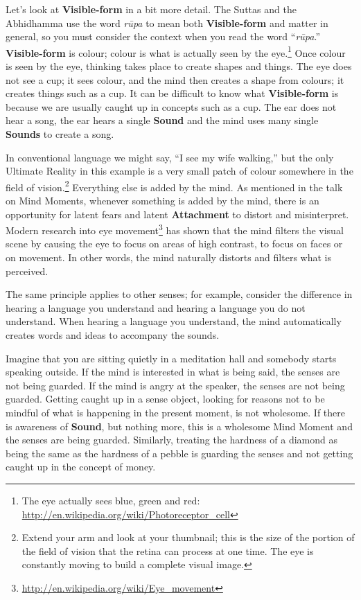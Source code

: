 Let’s look at \textbf{Visible-form} in a bit more detail. The Suttas and the Abhidhamma use the word \textit{rūpa} to mean both \textbf{Visible-form} and matter in general, so you must consider the context when you read the word “\textit{rūpa}.” \textbf{Visible-form} is colour; colour is what is actually seen by the eye.\footnote{The eye actually sees blue, green and red: \url{http://en.wikipedia.org/wiki/Photoreceptor_cell}} Once colour is seen by the eye, thinking takes place to create shapes and things. The eye does not see a cup; it sees colour, and the mind then creates a shape from colours; it creates things such as a cup. It can be difficult to know what \textbf{Visible-form} is because we are usually caught up in concepts such as a cup. The ear does not hear a song, the ear hears a single \textbf{Sound} and the mind uses many single \textbf{Sounds} to create a song.

In conventional language we might say, “I see my wife walking,” but the only Ultimate Reality in this example is a very small patch of colour somewhere in the field of vision.\footnote{Extend your arm and look at your thumbnail; this is the size of the portion of the field of vision that the retina can process at one time. The eye is constantly moving to build a complete visual image.} Everything else is added by the mind. As mentioned in the talk on Mind Moments, whenever something is added by the mind, there is an opportunity for latent fears and latent \textbf{Attachment} to distort and misinterpret. Modern research into eye movement\footnote{\url{http://en.wikipedia.org/wiki/Eye_movement}} has shown that the mind filters the visual scene by causing the eye to focus on areas of high contrast, to focus on faces or on movement. In other words, the mind naturally distorts and filters what is perceived.

The same principle applies to other senses; for example, consider the difference in hearing a language you understand and hearing a language you do not understand. When hearing a language you understand, the mind automatically creates words and ideas to accompany the sounds.

Imagine that you are sitting quietly in a meditation hall and somebody starts speaking outside. If the mind is interested in what is being said, the senses are not being guarded. If the mind is angry at the speaker, the senses are not being guarded. Getting caught up in a sense object, looking for reasons not to be mindful of what is happening in the present moment, is not wholesome. If there is awareness of \textbf{Sound}, but nothing more, this is a wholesome Mind Moment and the senses are being guarded. Similarly, treating the hardness of a diamond as being the same as the hardness of a pebble is guarding the senses and not getting caught up in the concept of money.

